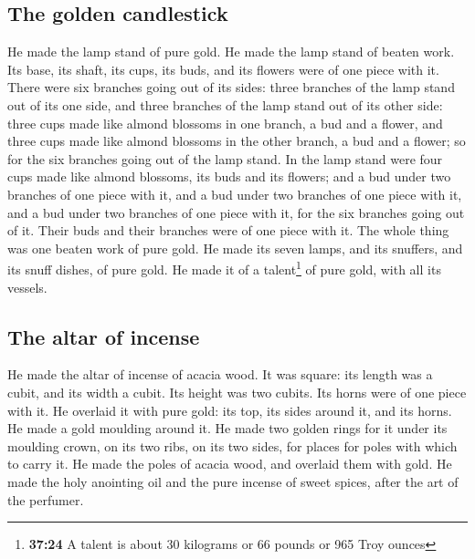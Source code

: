 \hypertarget{the-golden-candlestick}{%
\subsection{The golden candlestick}\label{the-golden-candlestick}}

 He made the lamp stand of pure gold. He made the lamp
stand of beaten work. Its base, its shaft, its cups, its buds, and its
flowers were of one piece with it.  There were six
branches going out of its sides: three branches of the lamp stand out of
its one side, and three branches of the lamp stand out of its other
side:  three cups made like almond blossoms in one
branch, a bud and a flower, and three cups made like almond blossoms in
the other branch, a bud and a flower; so for the six branches going out
of the lamp stand.  In the lamp stand were four cups made
like almond blossoms, its buds and its flowers;  and a
bud under two branches of one piece with it, and a bud under two
branches of one piece with it, and a bud under two branches of one piece
with it, for the six branches going out of it.  Their
buds and their branches were of one piece with it. The whole thing was
one beaten work of pure gold.  He made its seven lamps,
and its snuffers, and its snuff dishes, of pure gold.  He
made it of a talent\footnote{\textbf{37:24} A talent is about 30
  kilograms or 66 pounds or 965 Troy ounces} of pure gold, with all its
vessels.

\hypertarget{the-altar-of-incense}{%
\subsection{The altar of incense}\label{the-altar-of-incense}}

 He made the altar of incense of acacia wood. It was
square: its length was a cubit, and its width a cubit. Its height was
two cubits. Its horns were of one piece with it.  He
overlaid it with pure gold: its top, its sides around it, and its horns.
He made a gold moulding around it.  He made two golden
rings for it under its moulding crown, on its two ribs, on its two
sides, for places for poles with which to carry it.  He
made the poles of acacia wood, and overlaid them with gold.
 He made the holy anointing oil and the pure incense of
sweet spices, after the art of the perfumer.

